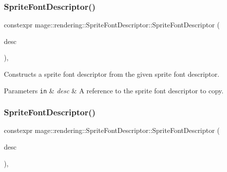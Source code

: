 \subsubsection{\texorpdfstring{Sprite\+Font\+Descriptor()}{SpriteFontDescriptor()}\hspace{0.1cm}{\footnotesize\ttfamily [2/3]}}
{\footnotesize\ttfamily constexpr mage\+::rendering\+::\+Sprite\+Font\+Descriptor\+::\+Sprite\+Font\+Descriptor (\begin{DoxyParamCaption}\item[{const \hyperlink{classmage_1_1rendering_1_1_sprite_font_descriptor}{Sprite\+Font\+Descriptor} \&}]{desc }\end{DoxyParamCaption})\hspace{0.3cm}{\ttfamily [default]}, {\ttfamily [noexcept]}}

Constructs a sprite font descriptor from the given sprite font descriptor.


\begin{DoxyParams}[1]{Parameters}
\mbox{\tt in}  & {\em desc} & A reference to the sprite font descriptor to copy. \\
\hline
\end{DoxyParams}
\hypertarget{classmage_1_1rendering_1_1_sprite_font_descriptor_a1a84c848b090000d444fdade6ca171e2}{}\label{classmage_1_1rendering_1_1_sprite_font_descriptor_a1a84c848b090000d444fdade6ca171e2} 
\subsubsection{\texorpdfstring{Sprite\+Font\+Descriptor()}{SpriteFontDescriptor()}\hspace{0.1cm}{\footnotesize\ttfamily [3/3]}}
{\footnotesize\ttfamily constexpr mage\+::rendering\+::\+Sprite\+Font\+Descriptor\+::\+Sprite\+Font\+Descriptor (\begin{DoxyParamCaption}\item[{\hyperlink{classmage_1_1rendering_1_1_sprite_font_descriptor}{Sprite\+Font\+Descriptor} \&\&}]{desc }\end{DoxyParamCaption})\hspace{0.3cm}{\ttfamily [default]}, {\ttfamily [noexcept]}}

